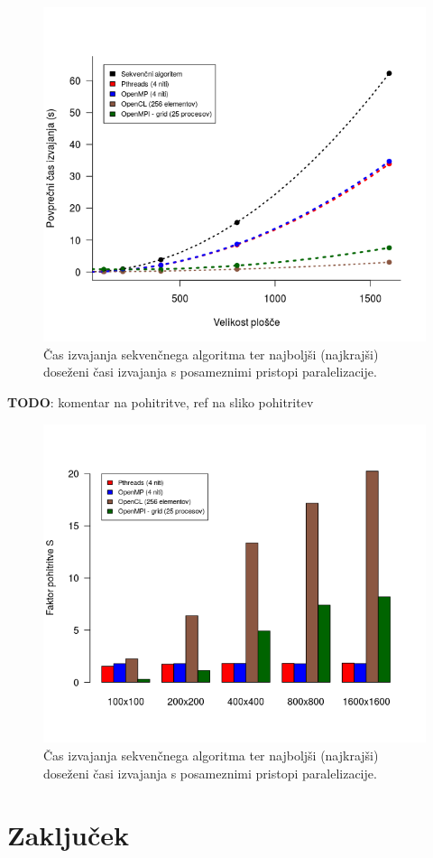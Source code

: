\documentclass[a4paper,titlepage,11pt]{article}
\begin{document}
\begin{figure}[H]
\begin{center}
\includegraphics[scale=0.7]{graf-rezultati-6-pregled.png}
\caption{Čas izvajanja sekvenčnega algoritma ter najboljši (najkrajši) doseženi časi izvajanja s posameznimi pristopi paralelizacije.}
\label{graf-rezultati-pregled-6}
\end{center}
\vspace{-25pt}
\end{figure}

\textbf{TODO}: komentar na pohitritve, ref na sliko pohitritev

\begin{figure}[H]
\begin{center}
\includegraphics[scale=0.7]{graf-rezultati-6_1-pregled.png}
\caption{Čas izvajanja sekvenčnega algoritma ter najboljši (najkrajši) doseženi časi izvajanja s posameznimi pristopi paralelizacije.}
\label{graf-rezultati-pohitritve-pregled-6}
\end{center}
\vspace{-25pt}
\end{figure}

\section{Zaključek}
\end{document}
